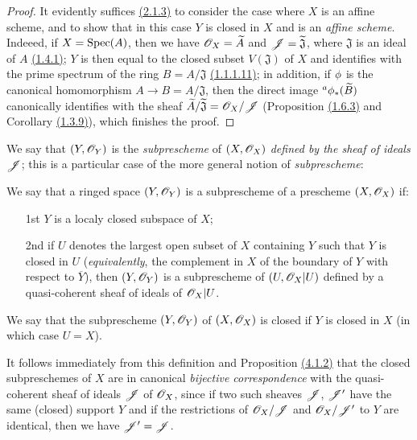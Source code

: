 \begin{proof}
\label{proof-prop-1.4.1.2}
It evidently suffices \hyperref[prop-1.2.1.3]{(2.1.3)} to consider the case where $X$ is an
affine scheme, and to show that in this case $Y$ is closed in $X$ and is an {\em affine
scheme}. Indeeed, if $X={\mathop{\mathrm{Spec}}\nolimits}(A)$, then we have $\mathscr{O}_X=\widetilde{A}$ and
$\mathscr{J}=\widetilde{\mathfrak{J}}$, where $\mathfrak{J}$ is an ideal of $A$
\hyperref[thm-1.1.4.1]{(1.4.1)}; $Y$ is then equal to the closed subset $V(\mathfrak{J})$ of
$X$ and identifies with the prime spectrum of the ring $B=A/\mathfrak{J}$
\hyperref[prop-1.1.1.11]{(1.1.1.11)}; in addition, if $\phi$ is the canonical
homomorphism $A\to B=A/\mathfrak{J}$, then the direct image ${}^a\phi_*(\widetilde{B})$
canonically identifies with the sheaf $\widetilde{A}/\widetilde{\mathfrak{J}}=\mathscr{O}_X/\mathscr{J}$
(Proposition \hyperref[prop-1.1.6.3]{(1.6.3)} and Corollary \hyperref[cor-1.1.3.9]{(1.3.9)}),
which finishes the proof.
\end{proof}

We say that $(Y,\mathscr{O}_Y)$ is the {\em subprescheme} of $(X,\mathscr{O}_X)$ {\em defined by the
sheaf of ideals $\mathscr{J}$}; this is a particular case of the more general notion of
{\em subprescheme}:

\begin{defn}[4.1.3]
\label{defn-1.4.1.3}
We say that a ringed space $(Y,\mathscr{O}_Y)$ is a subprescheme of a prescheme $(X,\mathscr{O}_X)$ if:
\begin{itemize}
  \item[1st] $Y$ is a localy closed subspace of $X$;
  \item[2nd] if $U$ denotes the largest open subset of $X$ containing $Y$ such that
    $Y$ is closed in $U$ ({\em equivalently}, the complement in $X$ of the
    boundary of $Y$ with respect to $\overline{Y}$), then $(Y,\mathscr{O}_Y)$ is
    a subprescheme of $(U,\mathscr{O}_X|U)$ defined by a quasi-coherent sheaf of ideals of $\mathscr{O}_X|U$.
\end{itemize}
We say that the subprescheme $(Y,\mathscr{O}_Y)$ of $(X,\mathscr{O}_X)$ is closed if $Y$ is closed in $X$
(in which case $U=X$).
\end{defn}

It follows immediately from this definition and Proposition \hyperref[prop-1.4.1.2]{(4.1.2)}
that the closed subpreschemes of $X$ are in canonical {\em bijective correspondence} with the
quasi-coherent sheaf of ideals $\mathscr{J}$ of $\mathscr{O}_X$, since if two such sheaves
$\mathscr{J}$, $\mathscr{J}'$ have the same (closed) support $Y$ and if the restrictions of
$\mathscr{O}_X/\mathscr{J}$ and $\mathscr{O}_X/\mathscr{J}'$ to $Y$ are identical, then we have $\mathscr{J}'=\mathscr{J}$.

